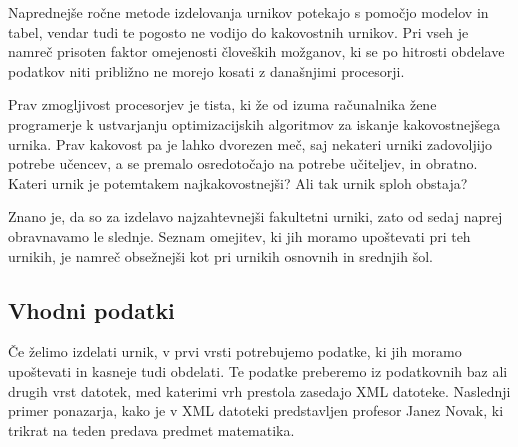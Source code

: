\documentclass[a4paper]{article}
\begin{document}
Naprednejše ročne metode izdelovanja urnikov potekajo s pomočjo modelov in tabel, vendar
tudi te pogosto ne vodijo do kakovostnih urnikov. Pri vseh je namreč prisoten faktor
omejenosti človeških možganov, ki se po hitrosti obdelave podatkov niti približno ne
morejo kosati z današnjimi procesorji.

Prav zmogljivost procesorjev je tista, ki že od izuma računalnika žene programerje k
ustvarjanju optimizacijskih algoritmov za iskanje kakovostnejšega urnika. Prav kakovost
pa je lahko dvorezen meč, saj nekateri urniki zadovoljijo potrebe učencev, a se premalo
osredotočajo na potrebe učiteljev, in obratno. Kateri urnik je potemtakem najkakovostnejši?
Ali tak urnik sploh obstaja?

Znano je, da so za izdelavo najzahtevnejši fakultetni urniki, zato od sedaj naprej
obravnavamo le slednje. Seznam omejitev, ki jih moramo upoštevati pri teh urnikih,
je namreč obsežnejši kot pri urnikih osnovnih in srednjih šol.

\subsection{Vhodni podatki} %

Če želimo izdelati urnik, v prvi vrsti potrebujemo podatke, ki jih moramo upoštevati in
kasneje tudi obdelati. Te podatke preberemo iz podatkovnih baz ali drugih vrst datotek,
med katerimi vrh prestola zasedajo XML datoteke. Naslednji primer ponazarja, kako je v
XML datoteki predstavljen profesor Janez Novak, ki trikrat na teden predava predmet
matematika.


\end{document}
